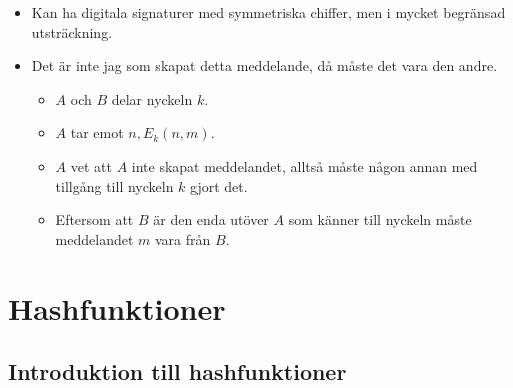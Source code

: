 \documentclass{beamer}
\theoremstyle{definition}
\begin{document}
\begin{frame}{\insertsubsectionhead}
  \begin{itemize}
    \item Kan ha digitala signaturer med symmetriska chiffer, men i mycket 
      begränsad utsträckning.

    \item Det är inte jag som skapat detta meddelande, då måste det vara den 
      andre.
      \begin{itemize}
        \item \(A\) och \(B\) delar nyckeln \(k\).

        \item \(A\) tar emot \(n, E_{k}(n, m)\).

        \item \(A\) vet att \(A\) inte skapat meddelandet, alltså måste någon 
          annan med tillgång till nyckeln \(k\) gjort det.

        \item Eftersom att \(B\) är den enda utöver \(A\) som känner till 
          nyckeln måste meddelandet \(m\) vara från \(B\).

      \end{itemize}
  \end{itemize}
\end{frame}


\section{Hashfunktioner}

\subsection{Introduktion till hashfunktioner}
\end{document}
